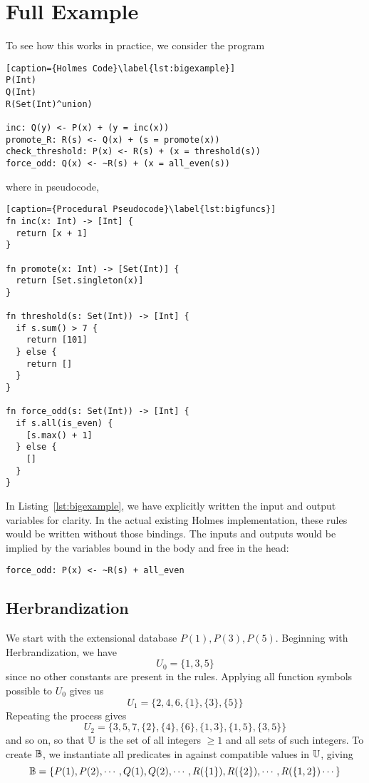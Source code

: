 \section{Full Example}
To see how this works in practice, we consider the program
\begin{lstlisting}[caption={Holmes Code}\label{lst:bigexample}] 
P(Int)
Q(Int)
R(Set(Int)^union)

inc: Q(y) <- P(x) + (y = inc(x))
promote_R: R(s) <- Q(x) + (s = promote(x))
check_threshold: P(x) <- R(s) + (x = threshold(s))
force_odd: Q(x) <- ~R(s) + (x = all_even(s))
\end{lstlisting}
where in pseudocode,
\begin{lstlisting}[caption={Procedural Pseudocode}\label{lst:bigfuncs}]
fn inc(x: Int) -> [Int] {
  return [x + 1]
}

fn promote(x: Int) -> [Set(Int)] {
  return [Set.singleton(x)]
}

fn threshold(s: Set(Int)) -> [Int] {
  if s.sum() > 7 {
    return [101]  
  } else {
    return []
  }
}

fn force_odd(s: Set(Int)) -> [Int] {
  if s.all(is_even) {
    [s.max() + 1]
  } else {
    []
  }
}
\end{lstlisting}

In Listing~\ref{lst:bigexample}, we have explicitly written the input and output variables for clarity.
In the actual existing Holmes implementation, these rules would be written without those bindings.
The inputs and outputs would be implied by the variables bound in the body and free in the head:
\begin{lstlisting}[numbers=none]
force_odd: P(x) <- ~R(s) + all_even
\end{lstlisting}


\subsection{Herbrandization}
We start with the extensional database $P(1), P(3), P(5)$.
Beginning with Herbrandization, we have
\[
	U_0 = \{1, 3, 5\}
\]
since no other constants are present in the rules.
Applying all function symbols possible to $U_0$ gives us
\[
	U_1 = \{2, 4, 6, \{1\}, \{3\}, \{5\}\}
\]
Repeating the process gives
\[
	U_2 = \{3, 5, 7, \{2\}, \{4\}, \{6\}, \{1, 3\}, \{1, 5\}, \{3, 5\}\}
\]
and so on, so that $\mathbb{U}$ is the set of all integers $\geq 1$ and all sets of such integers.
To create $\mathbb{B}$, we instantiate all predicates in against compatible values in $\mathbb{U}$, giving
\[
	\mathbb{B} = \{P(1), P(2), \cdots, Q(1), Q(2), \cdots, R(\{1\}), R(\{2\}), \cdots, R(\{1, 2\}) \cdots\}
\]


